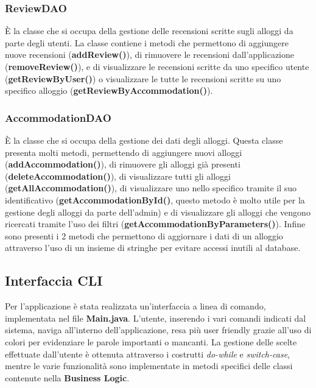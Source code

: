 \documentclass[10pt]{article}
\begin{document}
\subsubsection{ReviewDAO}

\`E la classe che si occupa della gestione delle recensioni scritte sugli alloggi da parte degli utenti. La classe contiene i metodi che permettono di aggiungere nuove recensioni (\textbf{addReview()}), di rimuovere le recensioni dall'applicazione (\textbf{removeReview()}), e di visualizzare le recensioni scritte da uno specifico utente (\textbf{getReviewByUser()}) o visualizzare le tutte le recensioni scritte su uno specifico alloggio (\textbf{getReviewByAccommodation()}). 

\subsubsection{AccommodationDAO}

\`E la classe che si occupa della gestione dei dati degli alloggi. Questa classe presenta molti metodi, permettendo di aggiungere nuovi alloggi (\textbf{addAccommodation()}), di rimuovere gli alloggi già presenti (\textbf{deleteAccommodation()}), di visualizzare tutti gli alloggi (\textbf{getAllAccommodation()}), di visualizzare uno nello specifico tramite il suo identificativo (\textbf{getAccommodationById()}, questo metodo è molto utile per la gestione degli alloggi da parte dell'admin) e di visualizzare gli alloggi che vengono ricercati tramite l'uso dei filtri (\textbf{getAccommodationByParameters()}). Infine sono presenti i  2 metodi che permettono di aggiornare i dati di un alloggio attraverso l'uso di un insieme di stringhe per evitare accessi inutili al database. 

\subsection{Interfaccia CLI}

Per l'applicazione è stata realizzata un'interfaccia a linea di comando, implementata nel file \textbf{Main.java}. L'utente, inserendo i vari comandi indicati dal sistema, naviga all'interno dell'applicazione, resa più user friendly grazie all'uso di colori per evidenziare le parole importanti o mancanti. La gestione delle scelte effettuate dall'utente è ottenuta attraverso i costrutti \textit{do-while} e \textit{switch-case}, mentre le varie funzionalità sono implementate in metodi specifici delle classi contenute nella \textbf{Business Logic}.
\end{document}
